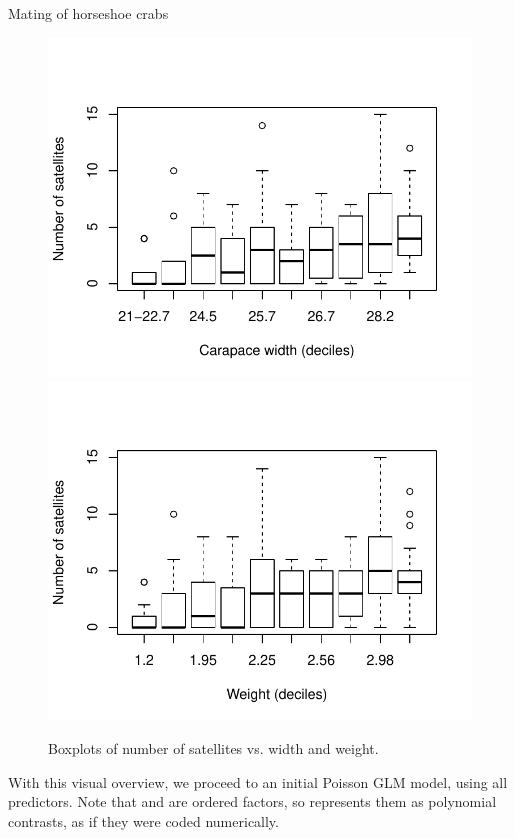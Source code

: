 \documentclass[11pt]{book}\usepackage[]{graphicx}\usepackage[]{color}
\newenvironment{knitrout}{}{} %
\renewenvironment{knitrout}{\small\renewcommand{\baselinestretch}{.85}}{} %
\begin{document}
\begin{Example}[crabs1]{Mating of horseshoe crabs}
\begin{knitrout}
\begin{figure}[!htbp]
\centerline{\includegraphics[width=.49\textwidth]{ch09/fig/crabs1-boxplots-1} 
\includegraphics[width=.49\textwidth]{ch09/fig/crabs1-boxplots-2} }

\caption[Boxplots of number of satellites vs]{Boxplots of number of satellites vs. width and weight.\label{fig:crabs1-boxplots}}
\end{figure}


\end{knitrout}

With this visual overview, we proceed to an initial Poisson GLM model, using all predictors.
Note that  and  are ordered factors, so  represents them
as polynomial contrasts, as if they were coded numerically.


\end{Example}
\end{document}
